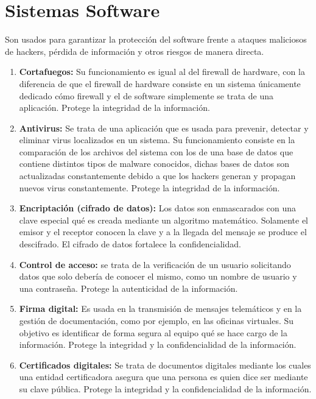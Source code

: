 \section{Sistemas Software}
Son usados para garantizar la protección del software frente a ataques maliciosos de hackers, pérdida de información y otros riesgos de manera directa.
\begin{enumerate}
\item {\bfseries Cortafuegos:}
Su funcionamiento es igual al del firewall de hardware, con la diferencia de que el firewall de hardware consiste en un sistema únicamente dedicado cómo firewall y el de software simplemente se trata de una aplicación. Protege la integridad de la información. 

\item {\bfseries Antivirus:}
Se trata de una aplicación que es usada para prevenir, detectar y eliminar virus localizados en un sistema. Su funcionamiento consiste en la comparación de los archivos del sistema con los de una base de datos que contiene distintos tipos de malware conocidos, dichas bases de datos son actualizadas constantemente debido a que los hackers generan y propagan nuevos virus constantemente. Protege la integridad de la información.\cite{antivirus}
\item {\bfseries Encriptación (cifrado de datos):}
Los datos son enmascarados con una clave especial qué es creada mediante un algoritmo matemático. Solamente el emisor y el receptor conocen la clave y a la llegada del mensaje se produce el descifrado. El cifrado de datos fortalece la confidencialidad. 
\item {\bfseries Control de acceso:}
se trata de la verificación de un usuario solicitando datos que solo debería de conocer el mismo, como un nombre de usuario y una contraseña. Protege la autenticidad de la información. 
\item {\bfseries Firma digital:}
Es usada en la transmisión de mensajes telemáticos y en la gestión de documentación, como por ejemplo, en las oficinas virtuales. Su objetivo es identificar de forma segura al equipo qué se hace cargo de la información. Protege la integridad y la confidencialidad de la información.
\item {\bfseries Certificados digitales:}
Se trata de documentos digitales mediante los cuales una entidad certificadora asegura que una persona es quien dice ser mediante su clave pública. Protege la integridad y la confidencialidad de la información. \cite{certificado}

\end{enumerate}






